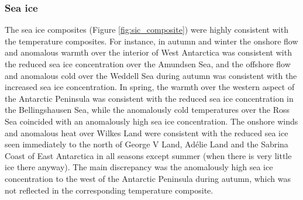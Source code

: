\subsubsection{Sea ice}

The sea ice composites (Figure \ref{fig:sic_composite}) were highly consistent with the temperature composites. For instance, in autumn and winter the onshore flow and anomalous warmth over the interior of West Antarctica was consistent with the reduced sea ice concentration over the Amundsen Sea, and the offshore flow and anomalous cold over the Weddell Sea during autumn was consistent with the increased sea ice concentration. In spring, the warmth over the western aspect of the Antarctic Peninsula was consistent with the reduced sea ice concentration in the Bellingshausen Sea, while the anomalously cold temperatures over the Ross Sea coincided with an anomalously high sea ice concentration. The onshore winds and anomalous heat over Wilkes Land were consistent with the reduced sea ice seen immediately to the north of George V Land, Ad{\'e}lie Land and the Sabrina Coast of East Antarctica in all seasons except summer (when there is very little ice there anyway). The main discrepancy was the anomalously high sea ice concentration to the west of the Antarctic Peninsula during autumn, which was not reflected in the corresponding temperature composite.